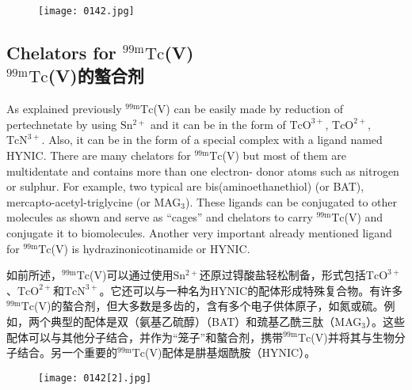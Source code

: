 \documentclass[dvipsnames, svgnames,a4paper,11pt]{article}
\begin{document}
\begin{figure}[h]
	\centering
    \texttt{[image: 0142.jpg]}    
     \label{fig149}
\end{figure}

\subsection{Chelators for ${}^\mathrm{99m}\mathrm{Tc}$(V) \\${}^\mathrm{99m}\mathrm{Tc}$(V)的螯合剂}

As explained previously ${}^\mathrm{99m}\mathrm{Tc}$(V) can be easily made by reduction of pertechnetate
by using $\mathrm{Sn^{2+}}$ and it can be in the form of $\mathrm{TcO^{3+}}$, $\mathrm{TcO^{2+}}$, $\mathrm{TcN^{3+}}$. Also, it can be in the
form of a special complex with a ligand named HYNIC. There are many chelators for
${}^\mathrm{99m}\mathrm{Tc}$(V) but most of them are multidentate and contains more than one electron-
donor atoms such as nitrogen or sulphur. For example, two typical are
bis(aminoethanethiol) (or BAT), mercapto-acetyl-triglycine (or MAG${}_3$). These ligands
can be conjugated to other molecules as shown and serve as “cages” and chelators
to carry ${}^\mathrm{99m}\mathrm{Tc}$(V) and conjugate it to biomolecules. Another very important already
mentioned ligand for ${}^\mathrm{99m}\mathrm{Tc}$(V) is hydrazinonicotinamide or HYNIC.

如前所述，${}^\mathrm{99m}\mathrm{Tc}$(V)可以通过使用$\mathrm{Sn^{2+}}$还原过锝酸盐轻松制备，形式包括$\mathrm{TcO^{3+}}$、$\mathrm{TcO^{2+}}$和$\mathrm{TcN^{3+}}$。它还可以与一种名为HYNIC的配体形成特殊复合物。有许多${}^\mathrm{99m}\mathrm{Tc}$(V)的螯合剂，但大多数是多齿的，含有多个电子供体原子，如氮或硫。例如，两个典型的配体是双（氨基乙硫醇）（BAT）和巯基乙酰三肽（MAG${}_3$）。这些配体可以与其他分子结合，并作为“笼子”和螯合剂，携带${}^\mathrm{99m}\mathrm{Tc}$(V)并将其与生物分子结合。另一个重要的${}^\mathrm{99m}\mathrm{Tc}$(V)配体是肼基烟酰胺（HYNIC）。

\begin{figure}[h]
	\centering
    \texttt{[image: 0142[2].jpg]}    
     \label{fig150}
\end{figure}
\end{document}
